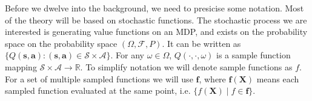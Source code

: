 \documentclass[]{uai2022} %
\newcommand{\defeq}{\vcentcolon=}
\newcommand{\E}{\mathbb{E}}
\newcommand{\D}{\mathcal{D}}
\newcommand{\B}{\mathcal{B}}
\newcommand{\X}{\mathbf{X}}
\newcommand{\f}{\mathbf{f}}
\newcommand{\state}{\mathcal{S}}
\newcommand{\action}{\mathcal{A}}
\begin{document}
Before we dwelve into the background, we need to presicise some notation. Most of the
theory will be based on stochastic functions. The stochastic process we are interested is
generating value functions on an MDP, and exists on the probability space on the probability
space \((\Omega, \mathcal{F}, P)\). It can be written as
\(\{Q(\bm{s}, \bm{a}) : (\bm{s}, \bm{a}) \in \state \times \action \}\). For
any \(\omega \in \Omega\), \(Q(\cdot, \cdot, \omega)\) is a sample function
mapping \(\state \times \action \rightarrow \mathbb{R}\). To simplify notation
we will denote sample functions as \(f\). For a set of multiple sampled functions we will
use \(\f\), where \(\f(\X)\) means each sampled function evaluated at the same point,
i.e. \(\{f(\X) \mid f \in \f\}\). 


\end{document}
